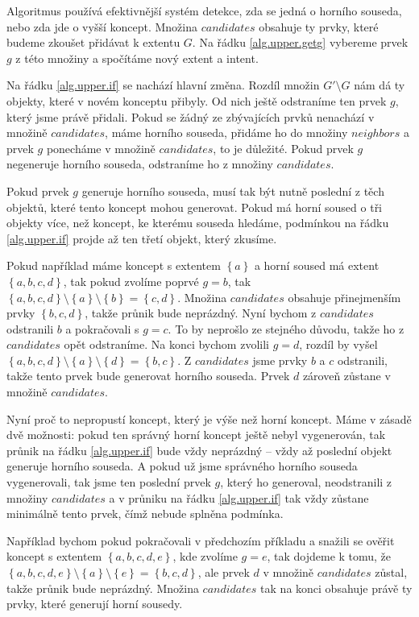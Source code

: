 \documentclass[12pt]{article}
\newcommand{\adds}[1]{\left\{#1\right\}}
\begin{document}
Algoritmus používá efektivnější systém detekce, zda se jedná o horního souseda, nebo zda jde o vyšší koncept. Množina $candidates$ obsahuje ty prvky, které budeme zkoušet přidávat k extentu $G$. Na řádku \ref{alg.upper.getg} vybereme prvek $g$ z této množiny a spočítáme nový extent a intent. 

Na řádku \ref{alg.upper.if} se nachází hlavní změna. Rozdíl množin $G'\setminus G$ nám dá ty objekty, které v novém konceptu přibyly. Od nich ještě odstraníme ten prvek $g$, který jsme právě přidali. Pokud se žádný ze zbývajících prvků nenachází v množině $candidates$, máme horního souseda, přidáme ho do množiny $neighbors$ a prvek $g$ ponecháme v množině $candidates$, to je důležité. Pokud prvek $g$ negeneruje horního souseda, odstraníme ho z množiny $candidates$.

Pokud prvek $g$ generuje horního souseda, musí tak být nutně poslední z těch objektů, které tento koncept mohou generovat. Pokud má horní soused o tři objekty více, než koncept, ke kterému souseda hledáme, podmínkou na řádku \ref{alg.upper.if} projde až ten třetí objekt, který zkusíme. 

Pokud například máme koncept s extentem $\adds{a}$ a horní soused má extent $\adds{a,b,c,d}$, tak pokud zvolíme poprvé $g=b$, tak $\adds{a,b,c,d} \setminus \adds{a} \setminus \adds{b} = \adds{c, d}$. Množina $candidates$ obsahuje přinejmenším prvky $\adds{b, c, d}$, takže průnik bude neprázdný. Nyní bychom z $candidates$ odstranili $b$ a pokračovali s $g=c$. To by neprošlo ze stejného důvodu, takže ho z $candidates$ opět odstraníme. Na konci bychom zvolili $g=d$, rozdíl by vyšel $\adds{a,b,c,d} \setminus \adds{a} \setminus \adds{d} = \adds{b, c}$. Z $candidates$ jsme prvky $b$ a $c$ odstranili, takže tento prvek bude generovat horního souseda. Prvek $d$ zároveň zůstane v množině $candidates$.

Nyní proč to nepropustí koncept, který je výše než horní koncept. Máme v zásadě dvě možnosti: pokud ten správný horní koncept ještě nebyl vygenerován, tak průnik na řádku \ref{alg.upper.if} bude vždy neprázdný -- vždy až poslední objekt generuje horního souseda. A pokud už jsme správného horního souseda vygenerovali, tak jsme ten poslední prvek $g$, který ho generoval, neodstranili z množiny $candidates$ a v průniku na řádku \ref{alg.upper.if} tak vždy zůstane minimálně tento prvek, čímž nebude splněna podmínka. 

Například bychom pokud pokračovali v předchozím příkladu a snažili se ověřit koncept s extentem $\adds{a,b,c,d,e}$, kde zvolíme $g=e$, tak dojdeme k tomu, že $\adds{a,b,c,d,e} \setminus \adds{a} \setminus \adds{e} = \adds{b,c,d}$, ale prvek $d$ v množině $candidates$ zůstal, takže průnik bude neprázdný. Množina $candidates$ tak na konci obsahuje právě ty prvky, které generují horní sousedy. 
\end{document}
